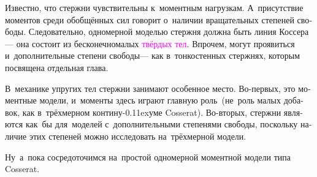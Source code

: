 \begin{otherlanguage}{russian}
Известно, что стержни чувствительны к~моментным нагрузкам.
А~присутствие моментов среди обобщённых сил говорит о~наличии вращательных степеней свободы.
Следовательно, одномерной моделью стержня должна быть линия Коссера\:--- она состоит из бесконечномалых \textcolor{magenta}{твёрдых тел}.
Впрочем, могут проявиться и~дополнительные степени свободы\:--- как в~тонкостенных стержнях, которым посвящена отдельная глава.

В~механике упругих тел стержни занимают особенное место.
Во\hbox{-}первых, это моментные модели, и~моменты здесь играют главную роль~(не~роль малых добавок, как в~трёхмерном контину\kern-0.11exуме Cosserat).
Во\hbox{-}вторых, стержни являются как~бы  для~моделей с~дополнительными степенями свободы, поскольку наличие этих степеней можно исследовать на~трёх\-мерной модели.

Ну~а~пока сосредоточимся на~простой одномерной моментной модели типа Cosserat.

\end{otherlanguage}



